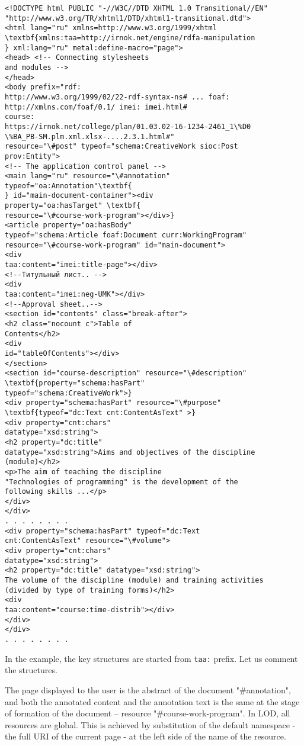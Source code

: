 \documentclass[12pt]{llncs}
\begin{document}
\begingroup\footnotesize
\begin{verbatim}
<!DOCTYPE html PUBLIC "-//W3C//DTD XHTML 1.0 Transitional//EN"
"http://www.w3.org/TR/xhtml1/DTD/xhtml1-transitional.dtd">
<html lang="ru" xmlns=http://www.w3.org/1999/xhtml
\textbf{xmlns:taa=http://irnok.net/engine/rdfa-manipulation
} xml:lang="ru" metal:define-macro="page">
<head> <!-- Connecting stylesheets
and modules -->
</head>
<body prefix="rdf:
http://www.w3.org/1999/02/22-rdf-syntax-ns# ... foaf:
http://xmlns.com/foaf/0.1/ imei: imei.html#
course:
https://irnok.net/college/plan/01.03.02-16-1234-2461_1\%D0
\%BA_PB-SM.plm.xml.xlsx-....2.3.1.html#"
resource="\#post" typeof="schema:CreativeWork sioc:Post
prov:Entity">
<!-- The application control panel -->
<main lang="ru" resource="\#annotation"
typeof="oa:Annotation"\textbf{
} id="main-document-container"><div
property="oa:hasTarget" \textbf{
resource="\#course-work-program"></div>}
<article property="oa:hasBody"
typeof="schema:Article foaf:Document curr:WorkingProgram"
resource="\#course-work-program" id="main-document">
<div
taa:content="imei:title-page"></div>
<!--Титульный лист.. -->
<div
taa:content="imei:neg-UMK"></div>
<!--Approval sheet..-->
<section id="contents" class="break-after">
<h2 class="nocount c">Table of
Contents</h2>
<div
id="tableOfContents"></div>
</section>
<section id="course-description" resource="\#description"
\textbf{property="schema:hasPart"
typeof="schema:CreativeWork">}
<div property="schema:hasPart" resource="\#purpose"
\textbf{typeof="dc:Text cnt:ContentAsText" >}
<div property="cnt:chars"
datatype="xsd:string">
<h2 property="dc:title"
datatype="xsd:string">Aims and objectives of the discipline
(module)</h2>
<p>The aim of teaching the discipline
"Technologies of programming" is the development of the
following skills ...</p>
</div>
</div>
. . . . . . . .
<div property="schema:hasPart" typeof="dc:Text
cnt:ContentAsText" resource="\#volume">
<div property="cnt:chars"
datatype="xsd:string">
<h2 property="dc:title" datatype="xsd:string">
The volume of the discipline (module) and training activities
(divided by type of training forms)</h2>
<div
taa:content="course:time-distrib"></div>
</div>
</div>
. . . . . . . .
\end{verbatim}
\endgroup

In the example, the key structures are started from \texttt{taa:} prefix. Let us
comment the structures.

The page displayed to the user is the abstract of the document
"\#annotation", and both the annotated content and the annotation text
is the same at the stage of formation of the document -- resource
"\#course-work-program". In LOD, all resources are global. This is
achieved by substitution of the default namespace - the full URI of the
current page - at the left side of the name of the resource.
\end{document}
